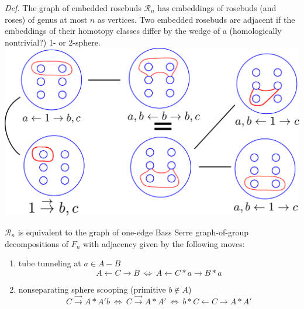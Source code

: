 \documentclass[11pt]{article}
\theoremstyle{remark}
\theoremstyle{definition}
\begin{document}
\noindent \emph{Def. }
The graph of embedded rosebuds
$\mathcal R_n$
has embeddings of rosebuds (and roses) of genus at most $n$ as vertices.
Two embedded rosebuds are adjacent if the embeddings of their
homotopy classes differ by
the wedge of a (homologically nontrivial?) 1- or 2-sphere.\\


\includegraphics[width=.8\textwidth]{figures/rosebudgraph.pdf}


$\mathcal R_n$ is equivalent to the graph of one-edge Bass Serre
graph-of-group decompositions of $F_n$ with adjacency given by
the following moves:
\begin{enumerate}
  \item tube tunneling at $a \in A - B$
  $$A \leftarrow C \rightarrow B  \ \Leftrightarrow  \ A \leftarrow C \ast a \rightarrow B \ast a$$
  \item nonseparating sphere scooping (primitive $b \not \in A$)
  $$
   C \stackrel{\rightarrow}{\rightarrow} A \ast A'b
    \ \Leftrightarrow  \
    C \stackrel{\rightarrow}{\rightarrow}  A \ast A'
     \ \Leftrightarrow  \
  b \ast C \leftarrow C \rightarrow  A \ast A'
  $$
\end{enumerate}




\nocite{*}

{}

\end{document}
